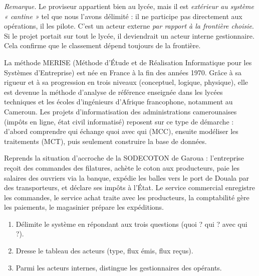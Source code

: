 \documentclass[11pt]{article}
\newcommand{\cle}[1]{{\popxbold\color{popdark}#1}}
\begin{document}
\begin{exoresolu}
\emph{Remarque.} Le proviseur appartient bien au lycée, mais il est \emph{extérieur au système « cantine »} tel que nous l'avons délimité : il ne participe pas directement aux opérations, il les pilote. C'est un acteur externe \emph{par rapport à la frontière choisie}. Si le projet portait sur tout le lycée, il deviendrait un acteur interne gestionnaire. Cela confirme que le classement dépend toujours de la frontière.
\end{exoresolu}

\begin{savaistu}
La méthode \cle{MERISE} (Méthode d'Étude et de Réalisation Informatique pour les Systèmes d'Entreprise) est née en France à la fin des années 1970. Grâce à sa rigueur et à sa progression en trois niveaux (conceptuel, logique, physique), elle est devenue la méthode d'analyse de référence enseignée dans les lycées techniques et les écoles d'ingénieurs d'Afrique francophone, notamment au Cameroun. Les projets d'informatisation des administrations camerounaises (impôts en ligne, état civil informatisé) reposent sur ce type de démarche : d'abord comprendre qui échange quoi avec qui (MCC), ensuite modéliser les traitements (MCT), puis seulement construire la base de données.
\end{savaistu}

\begin{exercice}
Reprends la situation d'accroche de la SODECOTON de Garoua : l'entreprise reçoit des commandes des filatures, achète le coton aux producteurs, paie les salaires des ouvriers via la banque, expédie les balles vers le port de Douala par des transporteurs, et déclare ses impôts à l'État. Le service commercial enregistre les commandes, le service achat traite avec les producteurs, la comptabilité gère les paiements, le magasinier prépare les expéditions.
\begin{enumerate}
  \item Délimite le système en répondant aux trois questions (quoi ? qui ? avec qui ?).
  \item Dresse le tableau des acteurs (type, flux émis, flux reçus).
  \item Parmi les acteurs internes, distingue les gestionnaires des opérants.
\end{enumerate}
\end{exercice}
\end{document}
